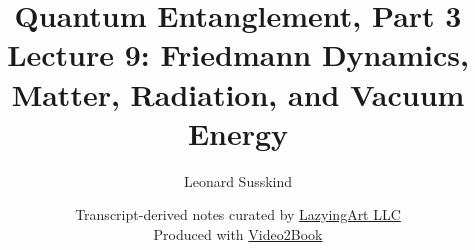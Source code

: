 \documentclass[11pt,oneside]{book}
\begin{document}
\hypersetup{pageanchor=false}
\frontmatter
\title{Quantum Entanglement, Part 3\\[0.45em]
\large Lecture 9: Friedmann Dynamics, Matter, Radiation, and Vacuum Energy}
\author{Leonard Susskind}
\date{Transcript-derived notes curated by
\href{https://lazying.art}{LazyingArt LLC}\\[0.35em]
\small Produced with
\href{https://github.com/lachlanchen/Video2Book}{Video2Book}}
\maketitle
\hypersetup{pageanchor=true}
\mainmatter

\end{document}
